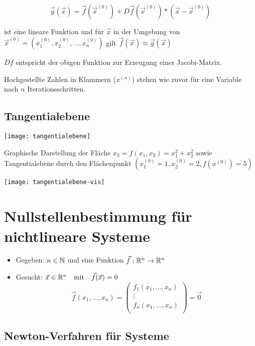 $$\vec{g}(\vec{x}) = \vec{f}(\vec{x}^{(0)}) + D\vec{f}(\vec{x}^{(0)}) * (\vec{x} - \vec{x}^{(0)})$$

ist eine lineare Funktion und für $\vec{x}$ in der Umgebung von
$\vec{x}^{(0)} = (x^{(0)}_1,x^{(0)}_2, ..., x^{(0)}_n)$
gilt $\vec{f}(\vec{x}) \approx \vec{g}(\vec{x})$

$Df$ entspricht der obigen Funktion zur Erzeugung einer Jacobi-Matrix.

Hochgestellte Zahlen in Klammern ($x^{(n)}$) stehen wie zuvor für eine Variable
nach $n$ Iterationsschritten.



\subsection{Tangentialebene}

\texttt{[image: tangentialebene]}


Graphische Darstellung der Fläche $x_3 = f(x_1, x_2) = x_1^2 + x_2^2$
sowie Tangentialebene durch den Flächenpunkt $(x^{(0)}_1 = 1, x^{(0)}_2 = 2, f(x^{(0)}) = 5)$


\texttt{[image: tangentialebene-vis]}








\section{Nullstellenbestimmung für nichtlineare Systeme}


\begin{itemize}
	\item Gegeben: $n \in \mathbb{N}$ und eine Funktion $\vec{f} : \mathbb{R}^n \to \mathbb{R}^n$
	\item Gesucht: $\vec{x} \in \mathbb{R}^n \quad \mathrm{mit} \quad \vec{f}(\vec{x}) = 0$
	      $$
		      \vec{f}(x_1,...,x_n) =
		      \begin{pmatrix}
			      f_1(x_1,...,x_n) \\
			      \vdots           \\
			      f_n(x_1,...,x_n) \\
		      \end{pmatrix}
		      = \vec{0}
	      $$
\end{itemize}






\subsection{Newton-Verfahren für Systeme}


